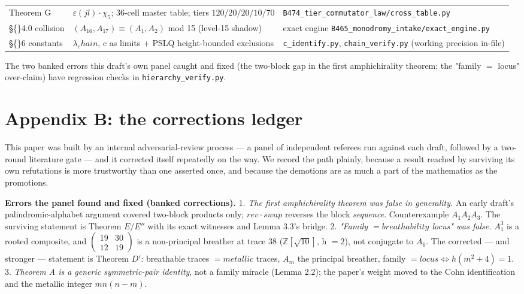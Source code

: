 \documentclass[11pt]{article}
\theoremstyle{plain}
\theoremstyle{definition}
\theoremstyle{remark}
\begin{document}
\begin{center}
\begin{tabular}{lll}
Theorem G & \(\varepsilon (jl)\cdot \chi _{5}\); 36-cell master table; tiers \(120/20/20/10/70\) & \texttt{B474\_tier\_commutator\_law/cross\_table.py} \\

\S\{\}4.0 collision & \((A_{16},A_{17}) \equiv  (A_{1},A_{2})\) mod 15 (level-15 shadow) & exact engine \texttt{B465\_monodromy\_intake/exact\_engine.py} \\

\S\{\}6 constants & \(\lambda _{c}hain\), c as limits + PSLQ height-bounded exclusions & \texttt{c\_identify.py}, \texttt{chain\_verify.py} (working precision in-file) \\

\hline\end{tabular}\end{center}

The two banked errors this draft's own panel caught and fixed (the two-block gap in the first amphichirality theorem; the "family \(=\) locus" over-claim) have regression checks in \texttt{hierarchy\_verify.py}.

\section{Appendix B: the corrections ledger}

This paper was built by an internal adversarial-review process — a panel of independent referees run against each draft, followed by a two-round literature gate — and it corrected itself repeatedly on the way. We record the path plainly, because a result reached by surviving its own refutations is more trustworthy than one asserted once, and because the demotions are as much a part of the mathematics as the promotions.

\textbf{Errors the panel found and fixed (banked corrections).} 1. \emph{The first amphichirality theorem was false in generality.} An early draft's palindromic-alphabet argument covered two-block products only; \(rev\cdot swap\) reverses the block \emph{sequence}. Counterexample \(A_{1}A_{2}A_{3}\). The surviving statement is Theorem \(E/E″\) with its exact witnesses and Lemma 3.3's bridge. 2. \emph{"Family \(= breathability\) locus" was false.} \(A_{1}^{3}\) is a rooted composite, and \(\left(\begin{smallmatrix}19 & 30\\12 & 19\end{smallmatrix}\right)\) is a non-principal breather at trace 38 (\(\mathbb{Z}[\sqrt{10}]\), h \(= 2\)), not conjugate to \(A_{6}\). The corrected — and stronger — statement is Theorem \(D\prime \): breathable traces \(= metallic\) traces, \(A_{m}\) the principal breather, family \(= locus \Longleftrightarrow  h(m^{2}+4) = 1\). 3. \emph{Theorem A is a generic symmetric-pair identity}, not a family miracle (Lemma 2.2); the paper's weight moved to the Cohn identification and the metallic integer \(mn(n-m)\).
\end{document}
